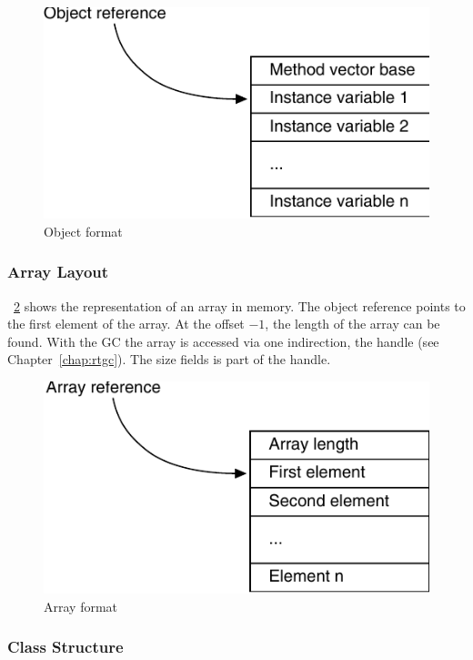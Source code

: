 \begin{figure}
    \centering
    \includegraphics[scale=\picscale]{jvm/jvm_object}
    \caption{Object format}
    \label{fig_jvm_object}
\end{figure}

\subsubsection{Array Layout}

\figurename~\ref{fig_jvm_array} shows the representation of an array
in memory. The object reference points to the first element of the
array. At the offset $-1$, the length of the array can be found.
With the GC the array is accessed via one indirection, the handle
(see Chapter~\ref{chap:rtgc}). The size fields is part of the
handle.

\begin{figure}
    \centering
    \includegraphics[scale=\picscale]{jvm/jvm_array}
    \caption{Array format}
    \label{fig_jvm_array}
\end{figure}


\subsubsection{Class Structure}

